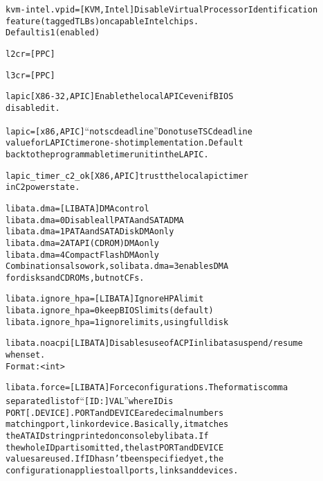 \documentclass[a4paper,8pt,english]{sphinxmanual}
\begin{document}
\begin{alltt}
        kvm-intel.vpid= {[}KVM,Intel{]} Disable Virtual Processor Identification
                        feature (tagged TLBs) on capable Intel chips.
                        Default is 1 (enabled)

        l2cr=           {[}PPC{]}

        l3cr=           {[}PPC{]}

        lapic           {[}X86-32,APIC{]} Enable the local APIC even if BIOS
                        disabled it.

        lapic=          {[}x86,APIC{]} ``notscdeadline'' Do not use TSC deadline
                        value for LAPIC timer one-shot implementation. Default
                        back to the programmable timer unit in the LAPIC.

        lapic\_timer\_c2\_ok       {[}X86,APIC{]} trust the local apic timer
                        in C2 power state.

        libata.dma=     {[}LIBATA{]} DMA control
                        libata.dma=0      Disable all PATA and SATA DMA
                        libata.dma=1      PATA and SATA Disk DMA only
                        libata.dma=2      ATAPI (CDROM) DMA only
                        libata.dma=4      Compact Flash DMA only
                        Combinations also work, so libata.dma=3 enables DMA
                        for disks and CDROMs, but not CFs.

        libata.ignore\_hpa=      {[}LIBATA{]} Ignore HPA limit
                        libata.ignore\_hpa=0       keep BIOS limits (default)
                        libata.ignore\_hpa=1       ignore limits, using full disk

        libata.noacpi   {[}LIBATA{]} Disables use of ACPI in libata suspend/resume
                        when set.
                        Format: \textless{}int\textgreater{}

        libata.force=   {[}LIBATA{]} Force configurations.  The format is comma
                        separated list of ``{[}ID:{]}VAL'' where ID is
                        PORT{[}.DEVICE{]}.  PORT and DEVICE are decimal numbers
                        matching port, link or device.  Basically, it matches
                        the ATA ID string printed on console by libata.  If
                        the whole ID part is omitted, the last PORT and DEVICE
                        values are used.  If ID hasn't been specified yet, the
                        configuration applies to all ports, links and devices.


\end{alltt}
\end{document}
